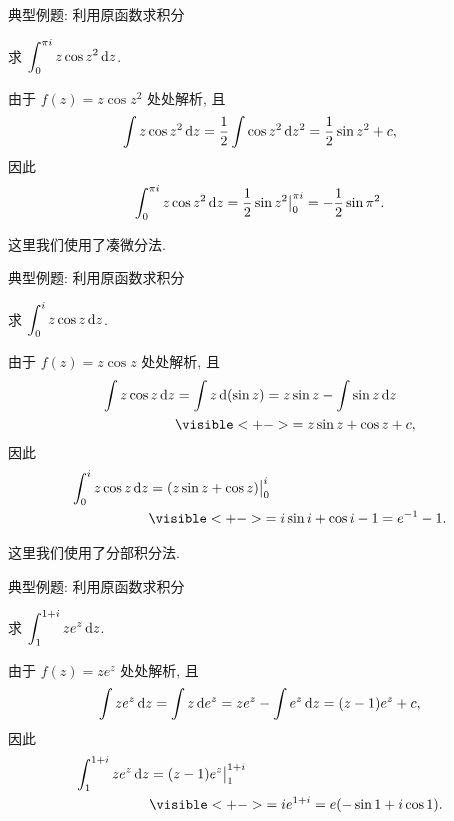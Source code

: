 \begin{frame}{典型例题: 利用原函数求积分}
\begin{example}
求 $\displaystyle\int_0^{\pi i}z\cos z^2\,\mathrm{d} z$.
\end{example}
\begin{solution}
由于 $f(z)=z\cos z^2$ 处处解析,
\onslide<+->
且
\[\int z\cos z^2\,\mathrm{d} z=\frac12\int \cos z^2\,\mathrm{d} z^2=\frac12\sin z^2+c,\]
\onslide<+->
因此
\[\int_0^{\pi i}z\cos z^2\,\mathrm{d} z=\frac12\sin z^2\big|_0^{\pi i}=-\frac12\sin \pi^2.\]
\end{solution}
\onslide<+->
这里我们使用了\alert{凑微分法}.
\end{frame}


\begin{frame}{典型例题: 利用原函数求积分}
\beqskip{3pt}
\begin{example}
求 $\displaystyle\int_0^i z\cos z\,\mathrm{d} z$.
\end{example}
\begin{solution}
由于 $f(z)=z\cos z$ 处处解析,
\onslide<+->
且
\begin{align*}
\int z\cos z\diff z&
=\int z\diff(\sin z)=z\sin z-\int \sin z\diff z\\
&\visible<+->{=z\sin z+\cos z+c,}
\end{align*}
\onslide<+->
因此
\begin{align*}
\int_0^i z\cos z\diff z&=(z\sin z+\cos z)\big|_0^i\\
&\visible<+->{=i\sin i+\cos i-1=e^{-1}-1.}
\end{align*}
\end{solution}
\onslide<+->
这里我们使用了\alert{分部积分法}.
\endgroup
\end{frame}


\begin{frame}{典型例题: 利用原函数求积分}
\beqskip{10pt}
\begin{example}
求 $\displaystyle\int_1^{1+i} z e^z\,\mathrm{d} z$.
\end{example}
\begin{solution}
由于 $f(z)=ze^z$ 处处解析,
\onslide<+->
且
\[\int z e^z\,\mathrm{d} z=\int z\,\mathrm{d} e^z=ze^z-\int e^z\,\mathrm{d} z=(z-1)e^z+c,\]
\onslide<+->
因此
\begin{align*}
\int_1^{1+i} z e^z\diff z&=(z-1)e^z\big|_1^{1+i}\\
&\visible<+->{=ie^{1+i}=e(-\sin 1+i\cos 1).}
\end{align*}
\end{solution}
\endgroup
\end{frame}


